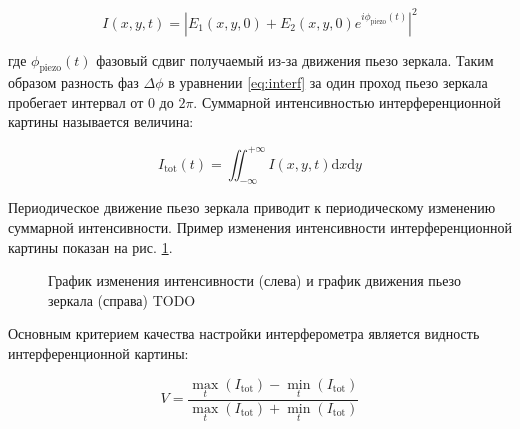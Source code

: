\begin{equation}
    I(x,y,t)=|E_1(x,y,0)+E_2(x,y,0)e^{i\phi_{\mathrm{piezo}}(t)}|^2  
\label{eq:I_def}
\end{equation}

где $\phi_{\mathrm{piezo}}(t)$ фазовый сдвиг получаемый из-за движения пьезо зеркала. Таким образом разность фаз $\Delta \phi$ в уравнении \ref{eq:interf} за один проход пьезо зеркала пробегает интервал от $0$ до $2\pi$. Суммарной интенсивностью интерференционной картины называется величина: 

\begin{equation}
    I_{\mathrm{tot}}(t) = \iint_{-\infty}^{+\infty} I(x, y, t) {\mathrm{d}}x{\mathrm{d}}y
\end{equation}

Периодическое движение пьезо зеркала приводит к периодическому изменению суммарной интенсивности. Пример изменения интенсивности интерференционной картины показан на рис. \ref{fig:intens_plot}.

\begin{figure}[ht]
\caption{График изменения интенсивности (слева) и график движения пьезо зеркала (справа) TODO}
\label{fig:intens_plot}
\end{figure}

Основным критерием качества настройки интерферометра является видность интерференционной картины: 

\begin{equation}
    V = \frac{            
        \max_{t}(I_{\mathrm{tot}}) - \min_t(I_{\mathrm{tot}})}
        {\max_{t}(I_{\mathrm{tot}}) + \min_t(I_{\mathrm{tot}})}
    \label{eq:visib}
\end{equation}

